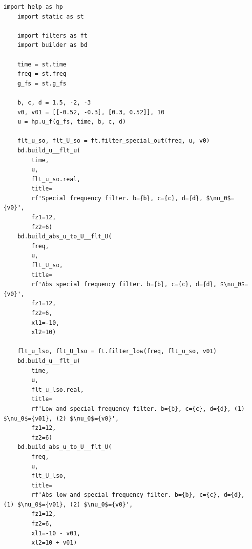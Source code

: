 \documentclass[a4paper, 12pt]{article}
\begin{document}
    \begin{lstlisting}[label=l7, caption={Файл nospec.py. Фильтрация специфических частот}]
    import help as hp
    import static as st

    import filters as ft
    import builder as bd

    time = st.time
    freq = st.freq
    g_fs = st.g_fs

    b, c, d = 1.5, -2, -3
    v0, v01 = [[-0.52, -0.3], [0.3, 0.52]], 10
    u = hp.u_f(g_fs, time, b, c, d)

    flt_u_so, flt_U_so = ft.filter_special_out(freq, u, v0)
    bd.build_u__flt_u(
        time,
        u,
        flt_u_so.real,
        title=
        rf'Special frequency filter. b={b}, c={c}, d={d}, $\nu_0$={v0}',
        fz1=12,
        fz2=6)
    bd.build_abs_u_to_U__flt_U(
        freq,
        u,
        flt_U_so,
        title=
        rf'Abs special frequency filter. b={b}, c={c}, d={d}, $\nu_0$={v0}',
        fz1=12,
        fz2=6,
        xl1=-10,
        xl2=10)

    flt_u_lso, flt_U_lso = ft.filter_low(freq, flt_u_so, v01)
    bd.build_u__flt_u(
        time,
        u,
        flt_u_lso.real,
        title=
        rf'Low and special frequency filter. b={b}, c={c}, d={d}, (1) $\nu_0$={v01}, (2) $\nu_0$={v0}',
        fz1=12,
        fz2=6)
    bd.build_abs_u_to_U__flt_U(
        freq,
        u,
        flt_U_lso,
        title=
        rf'Abs low and special frequency filter. b={b}, c={c}, d={d}, (1) $\nu_0$={v01}, (2) $\nu_0$={v0}',
        fz1=12,
        fz2=6,
        xl1=-10 - v01,
        xl2=10 + v01)
    \end{lstlisting}
\end{document}
